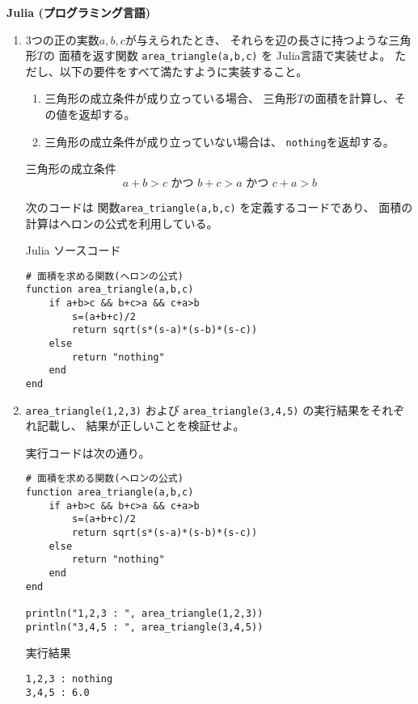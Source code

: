 \documentclass[12pt,b5paper]{ltjsarticle}
\begin{document}
\hrulefill

\textbf{Julia (プログラミング言語)}

\dotfill

\begin{enumerate}
 \item
      3つの正の実数$a,b,c$が与えられたとき、
      それらを辺の長さに持つような三角形$T$の
      面積を返す関数
      \texttt{area\_triangle(a,b,c)}
      を
      Julia言語で実装せよ。
      ただし、以下の要件をすべて満たすように実装すること。
      \begin{enumerate}
       \item
            三角形の成立条件が成り立っている場合、
            三角形$T$の面積を計算し、その値を返却する。
       \item
            三角形の成立条件が成り立っていない場合は、
            \texttt{nothing}を返却する。
      \end{enumerate}
      三角形の成立条件
      \begin{equation}
       a+b > c
        \text{ かつ }
       b+c > a
        \text{ かつ }
       c+a > b
      \end{equation}

      \dotfill

      次のコードは
      関数\texttt{area\_triangle(a,b,c)}
      を定義するコードであり、
      面積の計算はヘロンの公式を利用している。

      Julia ソースコード
      \begin{lstlisting}
# 面積を求める関数(ヘロンの公式)
function area_triangle(a,b,c)
    if a+b>c && b+c>a && c+a>b
        s=(a+b+c)/2
        return sqrt(s*(s-a)*(s-b)*(s-c))
    else
        return "nothing"
    end
end
      \end{lstlisting}

      \hrulefill

 \item
      \texttt{area\_triangle(1,2,3)}
      および
      \texttt{area\_triangle(3,4,5)}
      の実行結果をそれぞれ記載し、
      結果が正しいことを検証せよ。

      \dotfill

      実行コードは次の通り。

      \begin{lstlisting}
# 面積を求める関数(ヘロンの公式)
function area_triangle(a,b,c)
    if a+b>c && b+c>a && c+a>b
        s=(a+b+c)/2
        return sqrt(s*(s-a)*(s-b)*(s-c))
    else
        return "nothing"
    end
end

println("1,2,3 : ", area_triangle(1,2,3))
println("3,4,5 : ", area_triangle(3,4,5))
      \end{lstlisting}

      実行結果
      \begin{lstlisting}
1,2,3 : nothing
3,4,5 : 6.0
      \end{lstlisting}

      \hrulefill

\end{enumerate}
\end{document}
